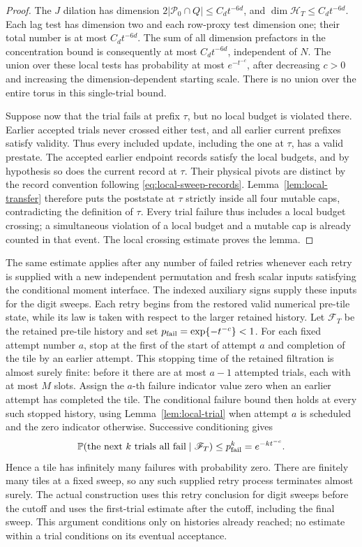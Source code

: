 \begin{proof}
The \(J\) dilation has dimension \(2|\mathcal P_0\cap Q|\le
C_dt^{-6d}\), and \(\dim\mathcal H_T\le C_dt^{-6d}\).  Each lag
test has dimension two and each row-proxy test dimension one; their
total number is at most \(C_dt^{-6d}\).  The sum of all dimension
prefactors in the concentration bound is consequently at most
\(C_dt^{-6d}\), independent of \(N\).  The union over these local
tests has probability at most \(e^{-t^{-c}}\), after decreasing
\(c>0\) and increasing the dimension-dependent starting scale.
There is no union over the entire torus in this single-trial bound.

Suppose now that the trial fails at prefix \(\tau\), but no local
budget is violated there.  Earlier accepted trials never crossed either
test, and all earlier current prefixes satisfy validity.  Thus
every included update, including the one at \(\tau\), has a valid
prestate.  The accepted earlier endpoint records satisfy the
local budgets, and by hypothesis so does the current record at
\(\tau\).  Their physical pivots are distinct by the record convention
following \eqref{eq:local-sweep-records}.  Lemma~\ref{lem:local-transfer}
therefore puts the poststate at \(\tau\) strictly inside all four
mutable caps, contradicting the definition of \(\tau\).  Every trial
failure thus includes a local budget crossing; a simultaneous violation
of a local budget and a mutable cap is already counted in that event.  The local
crossing estimate proves the lemma.
\end{proof}

The same estimate applies after any number of failed retries whenever
each retry is supplied with a new independent permutation and fresh
scalar inputs satisfying the conditional moment interface.  The indexed
auxiliary signs supply these inputs for the digit sweeps.  Each retry
begins from the restored valid numerical pre-tile state, while its law
is taken with respect to the larger retained history.  Let
\(\mathscr F_T\) be the retained pre-tile history and set
\(p_{\rm fail}=\exp\{-t^{-c}\}<1\). For each fixed attempt number \(a\),
stop at the first of the start of attempt \(a\) and completion of the tile
by an earlier attempt. This stopping time of the retained filtration is almost surely
finite: before it there are at most \(a-1\) attempted trials, each with at
most \(M\) slots. Assign the \(a\)-th failure indicator value zero when an
earlier attempt has completed the tile. The conditional failure bound then
holds at every such stopped history, using Lemma~\ref{lem:local-trial} when
attempt \(a\) is scheduled and the zero indicator otherwise. Successive
conditioning gives
\[
 \mathbb P(\text{the next }k\text{ trials all fail}\mid\mathscr F_T)
 \le p_{\rm fail}^k=e^{-kt^{-c}}.
\]
Hence a tile has infinitely many failures with probability zero.  There
are finitely many tiles at a fixed sweep, so any such supplied retry
process terminates almost surely.  The actual construction uses this
retry conclusion for digit sweeps before the cutoff and uses the
first-trial estimate after the cutoff, including the final sweep.
This argument conditions only
on histories already reached; no estimate within a trial conditions on
its eventual acceptance.

